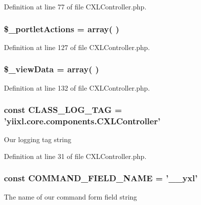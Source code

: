 Definition at line 77 of file CXLController.php.

\hypertarget{classCXLController_a2e9a5f68d4557c2e220a4a8b01cf9b1b}{
\subsubsection[{\$\_\-portletActions}]{\setlength{\rightskip}{0pt plus 5cm}\$\_\-portletActions = array( )}}
\label{classCXLController_a2e9a5f68d4557c2e220a4a8b01cf9b1b}


Definition at line 127 of file CXLController.php.

\hypertarget{classCXLController_a32acaa681d9d516f9964704f41590546}{
\subsubsection[{\$\_\-viewData}]{\setlength{\rightskip}{0pt plus 5cm}\$\_\-viewData = array( )}}
\label{classCXLController_a32acaa681d9d516f9964704f41590546}


Definition at line 132 of file CXLController.php.

\hypertarget{classCXLController_aa607ab5e557e6ebb60b85c5a20ad067f}{
\subsubsection[{CLASS\_\-LOG\_\-TAG}]{\setlength{\rightskip}{0pt plus 5cm}const {\bf CLASS\_\-LOG\_\-TAG} = 'yiixl.core.components.CXLController'}}
\label{classCXLController_aa607ab5e557e6ebb60b85c5a20ad067f}
Our logging tag  string 

Definition at line 31 of file CXLController.php.

\hypertarget{classCXLController_acfa3d37fd2964302d32a8905a102196d}{
\subsubsection[{COMMAND\_\-FIELD\_\-NAME}]{\setlength{\rightskip}{0pt plus 5cm}const {\bf COMMAND\_\-FIELD\_\-NAME} = '\_\-\_\-yxl'}}
\label{classCXLController_acfa3d37fd2964302d32a8905a102196d}
The name of our command form field  string 


